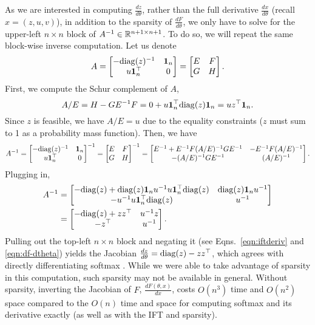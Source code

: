 \documentclass[11pt]{article}
\begin{document}
As we are interested in computing $\frac{dz}{d\theta}$,
rather than the full derivative $\frac{dx}{d\theta}$ (recall $x = (z,u,v)$),
in addition to the sparsity of $\frac{dF}{d\theta}$, 
we only have to solve for the upper-left $n\times n$ block of $A^{-1}\in\mathbb{R}^{n+1\times n+1}$.
To do so, we will repeat the same block-wise inverse computation.
Let us denote
$$A
= \begin{bmatrix} -\mathrm{diag}(z)^{-1} & \mathbf{1}_n \\ u\mathbf{1}_n^\top & 0 \end{bmatrix}
= \begin{bmatrix}E & F \\ G & H\end{bmatrix}.
$$
First, we compute the Schur complement of $A$,
\begin{equation}
A/E = H - GE^{-1}F = 0 + u\mathbf{1}_n^\top\mathrm{diag}(z)\mathbf{1}_n = uz^\top\mathbf{1}_n.
\end{equation}
Since $z$ is feasible, we have $A/E = u$ due to the equality constraints
($z$ must sum to 1 as a probability mass function).
Then, we have
\begin{equation}
A^{-1} = \begin{bmatrix}
-\mathrm{diag}(z)^{-1} & \mathbf{1}_n\\
u\mathbf{1}^\top_n & 0
\end{bmatrix}^{-1}
=\begin{bmatrix}E & F \\ G & H\end{bmatrix}^{-1}
= \begin{bmatrix}
E^{-1} + E^{-1}F(A/E)^{-1}GE^{-1} & -E^{-1}F(A/E)^{-1}\\
-(A/E)^{-1}GE^{-1} & (A/E)^{-1}
\end{bmatrix}.
\end{equation}
Plugging in,
\begin{equation}
\begin{aligned}
A^{-1} 
&= \begin{bmatrix}
-\mathrm{diag}(z) + \mathrm{diag}(z)\mathbf{1}_nu^{-1}u\mathbf{1}^\top_n\mathrm{diag}(z)
    & \mathrm{diag}(z)\mathbf{1}_nu^{-1}\\
-u^{-1}u\mathbf{1}^\top_n \mathrm{diag}(z) & u^{-1}
\end{bmatrix}\\
&= \begin{bmatrix}
-\mathrm{diag}(z) + zz^\top
    & u^{-1}z\\
    -z^\top & u^{-1}
\end{bmatrix}.
\end{aligned}
\end{equation}
Pulling out the top-left $n\times n$ block and negating it
(see Eqns.~\ref{eqn:iftderiv} and \ref{eqn:df-dtheta}) yields
the Jacobian $\frac{d z}{d\theta} = \mathrm{diag}(z) - zz^\top$,
which agrees with directly differentiating softmax \citep{sparsemax}.
While we were able to take advantage of sparsity in this computation,
such sparsity may not be available in general.
Without sparsity, inverting the Jacobian of $F$, $\frac{dF(\theta,x)}{dx}$,
costs $O(n^3)$ time and $O(n^2)$ space
compared to the $O(n)$ time and space for computing softmax and its
derivative exactly (as well as with the IFT and sparsity).
\end{document}
